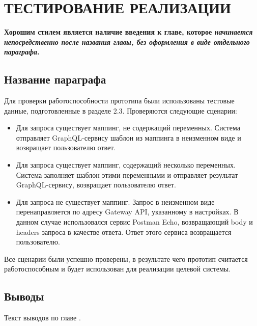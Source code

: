 \chapter{ТЕСТИРОВАНИЕ РЕАЛИЗАЦИИ} \label{ch4}

\textbf{Хорошим стилем является наличие введения к главе, которое \textit{начинается непосредственно после названия главы, без оформления в виде отдельного параграфа}.}

\section{Название параграфа} \label{ch4:sec1}

Для проверки работоспособности прототипа были использованы тестовые данные, подготовленные в разделе 2.3. Проверяются следующие сценарии:

\begin{itemize}
	\item Для запроса существует маппинг, не содержащий переменных.
	Система отправляет GraphQL-сервису шаблон из маппинга в неизменном виде и возвращает пользователю ответ.

	\item Для запроса существует маппинг, содержащий несколько переменных.
	Система заполняет шаблон этими переменными и отправляет результат GraphQL-сервису, возвращает пользователю ответ.

    \item Для запроса не существует маппинг.
	Запрос в неизменном виде перенаправляется по адресу Gateway API, указанному в настройках.
	В данном случае использовался сервис Postman Echo, возвращающий body и headers запроса в качестве ответа.
	Ответ этого сервиса возвращается пользователю.
\end{itemize}

Все сценарии были успешно проверены, в результате чего прототип считается работоспособным и будет использован для реализации целевой системы.


\section{Выводы} \label{ch4:conclusion}

Текст выводов по главе \thechapter.
